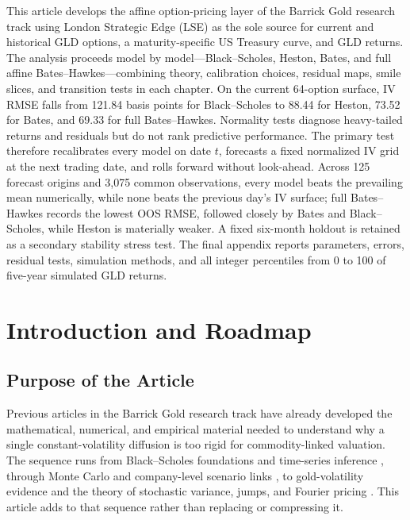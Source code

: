 \documentclass[a4paper,10pt,titlepage,oneside,openany]{book}
\theoremstyle{plain}
\theoremstyle{definition}
\theoremstyle{remark}
\newenvironment{tightabstract}[1][0.88]{%
  \begin{center}
  \begin{tcolorbox}[title={Abstract}, width=#1\textwidth, left=5mm, right=5mm,
    colback=white, boxrule=0.4pt]
  \small\justifying
}{%
  \end{tcolorbox}
  \end{center}
}
\begin{document}
\begin{titlepage}
\begin{center}
\vspace{1cm}
\begin{tightabstract}
This article develops the affine option-pricing layer of the Barrick Gold research track using London Strategic Edge (LSE) as the sole source for current and historical GLD options, a maturity-specific US Treasury curve, and GLD returns. The analysis proceeds model by model---Black--Scholes, Heston, Bates, and full affine Bates--Hawkes---combining theory, calibration choices, residual maps, smile slices, and transition tests in each chapter. On the current 64-option surface, IV RMSE falls from 121.84 basis points for Black--Scholes to 88.44 for Heston, 73.52 for Bates, and 69.33 for full Bates--Hawkes. Normality tests diagnose heavy-tailed returns and residuals but do not rank predictive performance. The primary test therefore recalibrates every model on date $t$, forecasts a fixed normalized IV grid at the next trading date, and rolls forward without look-ahead. Across 125 forecast origins and 3,075 common observations, every model beats the prevailing mean numerically, while none beats the previous day's IV surface; full Bates--Hawkes records the lowest OOS RMSE, followed closely by Bates and Black--Scholes, while Heston is materially weaker. A fixed six-month holdout is retained as a secondary stability stress test. The final appendix reports parameters, errors, residual tests, simulation methods, and all integer percentiles from 0 to 100 of five-year simulated GLD returns.
\end{tightabstract}
\end{center}
\end{titlepage}

\frontmatter
\clearpage
{}
\setcounter{page}{1}
\tableofcontents
\thispagestyle{plain}

\mainmatter
\clearpage
\setcounter{page}{1}


\chapter{Introduction and Roadmap}

\section{Purpose of the Article}

Previous articles in the Barrick Gold research track have already developed the mathematical, numerical, and empirical material needed to understand why a single constant-volatility diffusion is too rigid for commodity-linked valuation. The sequence runs from Black--Scholes foundations and time-series inference \cite{BarrickArticle1,BarrickArticle2}, through Monte Carlo and company-level scenario links \cite{BarrickArticle3,BarrickArticle4,BarrickArticle5}, to gold-volatility evidence and the theory of stochastic variance, jumps, and Fourier pricing \cite{BarrickArticle6,BarrickArticle7}. This article adds to that sequence rather than replacing or compressing it.
\end{document}
